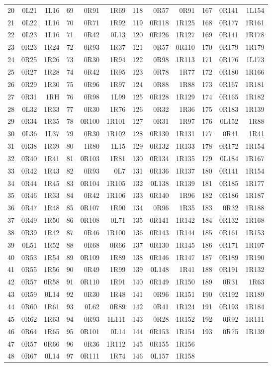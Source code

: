 \begin{center}
\begin{tabular}{rrr@{\hspace{13pt}}rrr@{\hspace{13pt}}rrr@{\hspace{13pt}}rrr}
20&0L21&1L16&69&0R91&1R69&118&0R57&0R91&167&0R141&1L154\\
21&0L22&1L16&70&0R71&1R92&119&0R118&1R125&168&0R177&1R161\\
22&0L23&1L16&71&0R42&0L13&120&0R126&1R127&169&0R141&1R178\\
23&0R23&1R24&72&0R93&1R37&121&0R57&0R110&170&0R179&1R179\\
24&0R25&1R26&73&0R30&1R94&122&0R98&1R113&171&0R176&1L173\\
25&0R27&1R28&74&0R42&1R95&123&0R78&1R77&172&0R180&1R166\\
26&0R29&1R30&75&0R96&1R97&124&0R88&1R88&173&0R167&1R181\\
27&0R31&1RH&76&0R98&1L99&125&0R128&1R129&174&0R165&1R182\\
28&0L32&1R33&77&0R30&1R76&126&0R32&1R36&175&0R183&1R139\\
29&0R34&1R35&78&0R100&1R101&127&0R31&1R97&176&0L152&1R88\\
30&0L36&1L37&79&0R30&1R102&128&0R130&1R131&177&0R41&1R41\\
31&0R38&1R39&80&1R80&1L15&129&0R132&1R133&178&0R172&1R154\\
32&0R40&1R41&81&0R103&1R81&130&0R134&1R135&179&0L184&1R167\\
33&0R42&1R43&82&0R93&0L7&131&0R136&1R137&180&0R141&1R154\\
34&0R44&1R45&83&0R104&1R105&132&0L138&1R139&181&0R185&1R177\\
35&0R46&1R33&84&0R42&1R106&133&0R140&1R96&182&0R186&1R187\\
36&0R47&1R48&85&0R107&1R90&134&0R96&1R35&183&0R32&1R188\\
37&0R49&1R50&86&0R108&0L71&135&0R141&1R142&184&0R132&1R168\\
38&0R39&1R42&87&0R46&1R100&136&0R143&1R144&185&0R161&1R153\\
39&0L51&1R52&88&0R68&0R66&137&0R130&1R145&186&0R171&1R107\\
40&0R53&1R54&89&0R109&1R89&138&0R146&1R147&187&0R189&1R190\\
41&0R55&1R56&90&0R49&1R99&139&0L148&1R41&188&0R191&1R132\\
42&0R57&0R58&91&0R110&1R91&140&0R149&1R150&189&0R31&1R63\\
43&0R59&0L14&92&0R30&1R48&141&0R96&1R151&190&0R192&1R189\\
44&0R60&1R61&93&0L62&0R89&142&0R41&1R124&191&0R193&1R184\\
45&0R62&1R63&94&0R93&1L111&143&0R28&1R152&192&0R92&1R111\\
46&0R64&1R65&95&0R101&0L14&144&0R153&1R154&193&0R75&1R139\\
47&0R57&0R66&96&0R36&1R112&145&0R155&1R156&&&\\
48&0R67&0L14&97&0R111&1R74&146&0L157&1R158&&&\\
\bottomrule\end{tabular}\end{center}\endgroup
